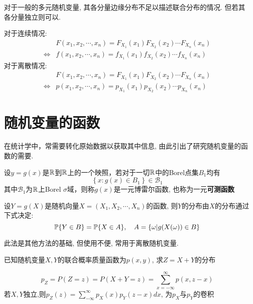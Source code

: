 \begin{remark}
    对于一般的多元随机变量, 其各分量边缘分布不足以描述联合分布的情况. 但若其各分量独立则可以.
\end{remark}

\begin{theorem}\label{thm:indep_cmf}
    对于连续情况:
    \begin{align*}
                        & F(x_1,x_2,\cdots ,x_n) = F_{X_1}(x_1)F_{X_2}(x_2)\cdots F_{X_n}(x_n) \\
        \Leftrightarrow & f(x_1,x_2,\cdots ,x_n) = f_{X_1}(x_1)f_{X_2}(x_2)\cdots f_{X_n}(x_n)
    \end{align*}
    对于离散情况:
    \begin{align*}
                        & F(x_1,x_2,\cdots ,x_n) = F_{X_1}(x_1)F_{X_2}(x_2)\cdots F_{X_n}(x_n) \\
        \Leftrightarrow & p(x_1,x_2,\cdots ,x_n) = p_{X_1}(x_1)p_{X_2}(x_2)\cdots p_{X_n}(x_n)
    \end{align*}
\end{theorem}

\section{随机变量的函数}

在统计学中，常需要转化原始数据以获取其中信息, 由此引出了研究随机变量的函数的需要.

\begin{definition}[可测函数]
    设$y =g(x)$是$\R$到$\R$上的一个映照，若对于一切$\R$中的Borel点集$B_1$均有
    \[\left\{ x:g(x) \in B_1 \right\} \in \mathcal{B}_1 \]
    其中$\mathcal{B}_1$为$\R$上Borel $\sigma$域，则称$g(x)$是一元博雷尔函数, 也称为一元\textbf{可测函数}
\end{definition}

\begin{theorem}[事件法]
    设$Y=g(X)$是随机向量$X=(X_1,X_2,\cdots ,X_n)$的函数, 则$Y$的分布由$X$的分布通过下式决定:
    \[ \P\{Y \in B\} = \P\{X \in A\}, \quad A=\{ \omega |g(X(\omega))\in B\} \]
\end{theorem}

此法是其他方法的基础, 但使用不便, 常用于离散随机变量.

\begin{example}\label{exp:sum_of_pmf}
    已知随机变量$X,Y$的联合概率质量函数为$p(x,y)$, 求$Z=X+Y$的分布
\end{example}

\begin{solution}
    \[ p_Z=P(Z=z)=P(X+Y=z)=\sum_{x=-\infty}^{\infty}p(x, z-x) \]
    若$X,Y$独立,则$p_Z(z)=\sum_{-\infty}^{\infty}p_X(x)p_Y(z-x)dx$, 为$p_X$与$p_Y$的卷积
\end{solution}

